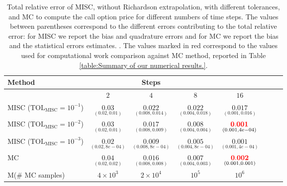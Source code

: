\begin{table}[h!]
	\centering
	\begin{tabular}{l*{6}{c}r}
	\toprule[1.5pt]
	Method & & Steps  & &     \\
	\hline		
		         & $2$ & $4$ & $8$ & $16$  \\
		\hline
		MISC ($\text{TOL}_{\text{MISC}}=10^{-1}$)  &  $\underset{(0.02,0.01)}{\mathbf{0.03}}$ & $\underset{(0.008,0.014)}{\mathbf{0.022}}$& $\underset{(0.004,0.018)}{\mathbf{ 0.022}}$ & $\underset{(0.001,0.016)}{\mathbf{ 0.017}}$   \\

		MISC ($\text{TOL}_{\text{MISC}}=10^{-2}$)  &  $\underset{(0.02,0.01)}{\mathbf{0.03}}$ & $\underset{(0.008,0.009)}{\mathbf{0.017}}$& $\underset{(0.004,0.004)}{\mathbf{ 0.008}}$ & $\underset{(0.001,4e-04)}{\mathbf{ {\color{red}0.001}}}$  \\
		MISC ($\text{TOL}_{\text{MISC}}=10^{-3}$)  &  $\underset{(0.02,8e-04)}{\mathbf{0.02}}$ & $\underset{(0.008,8e-04)}{\mathbf{0.009}}$& $\underset{(0.004,8e-04)}{\mathbf{0.005}}$  & $\underset{(0.001,4e-04)}{\mathbf{ 0.001}}$  \\
			\hline
				MC    & $\underset{(0.02,0.02)}{\mathbf{0.04}}$  &  $\underset{(0.008,0.008)}{\mathbf{0.016}}$  & $\underset{(0.004,0.003)}{\mathbf{0.007}}$ & $\underset{(0.001,0.001)}{\mathbf{{\color{red}0.002}}}$  \\	
			M(\# MC samples) 	& $4 \times 10^3$  &  $2 \times 10^4$  & $  10^5$ & $10^6$  \\
		\bottomrule[1.25pt]
	\end{tabular}
	\caption{Total relative error of MISC, without Richardson extrapolation,  with different tolerances, and MC to compute the call option price for different numbers of time steps. The values between parentheses correspond to the different errors contributing to the total relative error: for MISC we report the bias and quadrature errors and for MC we report the bias and the statistical errors estimates. . The values marked in red correspond to the values used for computational work comparison against MC method, reported in Table \ref{table:Summary of our numerical results.}.}
	\label{Total error of MISC and MC to compute Call option price of the different tolerances for different number of time steps. Case set 3, without Richardson extrapolation. The numbers between parentheses are the corresponding absolute errors.}
\end{table}


